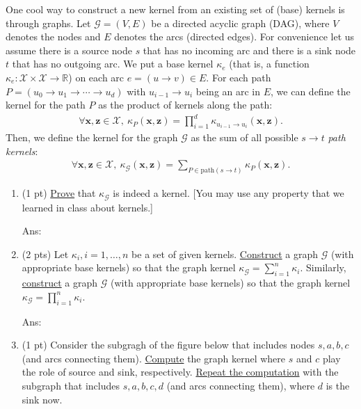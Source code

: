 \documentclass[10pt]{article}
\newcommand{\xv}{\mathbf{x}}
\newcommand{\zv}{\mathbf{z}}
\newcommand{\ans}[1]{{\color{blue}\textsf{Ans}: #1}}
\begin{document}
	\begin{exercise}
		One cool way to construct a new kernel from an existing set of (base) kernels is through graphs. Let $\mathcal{G} = (V, E)$ be a directed acyclic graph (DAG), where $V$ denotes the nodes and $E$ denotes the arcs (directed edges). For convenience let us assume there is a source node $s$ that has no incoming arc and there is a sink node $t$ that has no outgoing arc. We put a base kernel $\kappa_e$ (that is, a function $\kappa_e: \mathcal{X} \times \mathcal{X} \to \mathds{R}$) on each arc $e = (u \to v) \in E$. For each path $P = (u_0 \to u_1 \to \cdots \to u_d)$ with $u_{i-1} \to u_i$ being an arc in $E$, we can define the kernel for the path $P$ as the product of kernels along the path:
		\begin{align}
		\forall \xv, \zv \in \mathcal{X},~
		\kappa_P(\xv, \zv) = \prod_{i=1}^d \kappa_{u_{i-1}\to u_i} (\xv, \zv).
		\end{align}
		Then, we define the kernel for the graph $\mathcal{G}$ as the sum of all possible $s\to t$ \emph{path kernels}:
		\begin{align}
		\forall \xv, \zv \in \mathcal{X},~
		\kappa_{\mathcal{G}}(\xv, \zv) = \sum_{P \in \mathrm{path}(s \to t)} \kappa_P(\xv, \zv).
		\end{align}
		
		\begin{enumerate}
			\item (1 pt) \uline{Prove} that $\kappa_{\mathcal{G}}$ is indeed a kernel. [You may use any property that we learned in class about kernels.]
			
			\ans{\vskip5cm}
			
			\item (2 pts) Let $\kappa_i, i = 1, \ldots, n$ be a set of given kernels. \uline{Construct} a graph $\mathcal{G}$ (with appropriate base kernels) so that the graph kernel $\kappa_{\mathcal{G}} = \sum_{i=1}^n \kappa_i$. Similarly, \uline{construct} a graph $\mathcal{G}$ (with appropriate base kernels) so that the graph kernel $\kappa_{\mathcal{G}} = \prod_{i=1}^n \kappa_i$. 
		
			\ans{\vskip5cm}

			\item (1 pt) Consider the subgragh of the figure below that includes nodes $s, a, b, c$ (and arcs connecting them). \uline{Compute} the graph kernel where $s$ and $c$ play the role of source and sink, respectively. \uline{Repeat the computation} with the subgraph that includes $s, a, b, c, d$ (and arcs connecting them), where $d$ is the sink now.
			

\end{enumerate}
\end{exercise}
\end{document}
